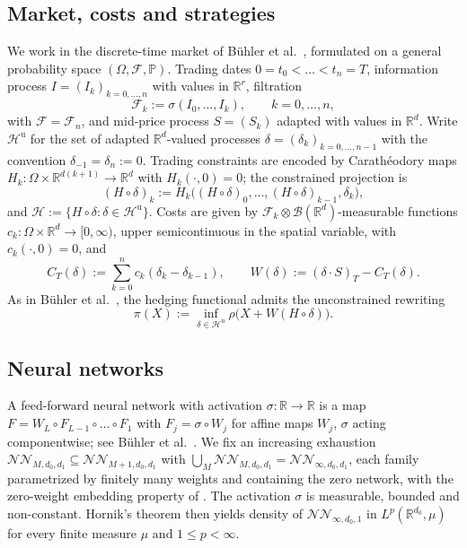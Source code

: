 \documentclass[11pt,a4paper]{report}
\numberwithin{equation}{chapter}
\theoremstyle{plain}
\theoremstyle{definition}
\newcommand{\PP}{\mathbb{P}}
\newcommand{\R}{\mathbb{R}}
\newcommand{\F}{\mathcal{F}}
\newcommand{\HH}{\mathcal{H}}
\newcommand{\Hu}{\mathcal{H}^{\mathrm{u}}}
\newcommand{\NNet}{\mathcal{N\!N}}
\begin{document}
\subsection*{Market, costs and strategies}

We work in the discrete-time market of B\"uhler et al.\ \cite{buehler}, formulated on a general probability space $(\Omega,\F,\PP)$. Trading dates $0=t_0<\dots<t_n=T$, information process $I=(I_k)_{k=0,\dots,n}$ with values in $\R^r$, filtration
\[
    \F_k:=\sigma(I_0,\dots,I_k),\qquad k=0,\dots,n,
\]
with $\F=\F_n$, and mid-price process $S=(S_k)$ adapted with values in $\R^d$. Write $\Hu$ for the set of adapted $\R^d$-valued processes $\delta=(\delta_k)_{k=0,\dots,n-1}$ with the convention $\delta_{-1}=\delta_n:=0$. Trading constraints are encoded by Carath\'eodory maps $H_k\colon\Omega\times\R^{d(k+1)}\to\R^d$ with $H_k(\cdot,0)=0$; the constrained projection is
\[
    (H\circ\delta)_k:=H_k\bigl((H\circ\delta)_0,\dots,(H\circ\delta)_{k-1},\delta_k\bigr),
\]
and $\HH:=\{H\circ\delta:\delta\in\Hu\}$. Costs are given by $\F_k\otimes\mathcal B(\R^d)$-measurable functions $c_k\colon\Omega\times\R^d\to[0,\infty)$, upper semicontinuous in the spatial variable, with $c_k(\cdot,0)=0$, and
\[
    C_T(\delta):=\sum_{k=0}^n c_k(\delta_k-\delta_{k-1}),\qquad
    W(\delta):=(\delta\cdot S)_T-C_T(\delta).
\]
As in B\"uhler et al.\ \cite[Lemma~4.2]{buehler}, the hedging functional admits the unconstrained rewriting
\begin{equation}\label{eq:pi-A}
    \pi(X):=\inf_{\delta\in\Hu}\rho\bigl(X+W(H\circ\delta)\bigr).
\end{equation}

\subsection*{Neural networks}

A feed-forward neural network with activation $\sigma\colon\R\to\R$ is a map $F=W_L\circ F_{L-1}\circ\dots\circ F_1$ with $F_j=\sigma\circ W_j$ for affine maps $W_j$, $\sigma$ acting componentwise; see B\"uhler et al.\ \cite[Definition~2]{buehler}. We fix an increasing exhaustion $\NNet_{M,d_0,d_1}\subseteq\NNet_{M+1,d_0,d_1}$ with $\bigcup_M\NNet_{M,d_0,d_1}=\NNet_{\infty,d_0,d_1}$, each family parametrized by finitely many weights and containing the zero network, with the zero-weight embedding property of \cite[Section~4.1]{buehler}. The activation $\sigma$ is measurable, bounded and non-constant. Hornik's theorem \cite[Theorems~1 and~2]{hornik} then yields density of $\NNet_{\infty,d_0,1}$ in $L^p(\R^{d_0},\mu)$ for every finite measure $\mu$ and $1\le p<\infty$.
\end{document}
